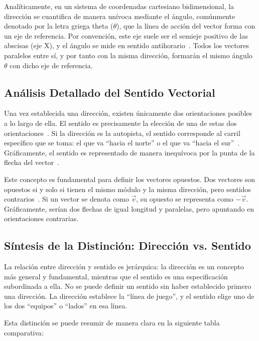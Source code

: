 \documentclass[12pt,a4paper]{article}
\begin{document}
Analíticamente, en un sistema de coordenadas cartesiano bidimensional, la dirección se cuantifica de manera unívoca mediante el ángulo, comúnmente denotado por la letra griega theta ($\theta$), que la línea de acción del vector forma con un eje de referencia. Por convención, este eje suele ser el semieje positivo de las abscisas (eje X), y el ángulo se mide en sentido antihorario~\cite{grossman2012}. Todos los vectores paralelos entre sí, y por tanto con la misma dirección, formarán el mismo ángulo $\theta$ con dicho eje de referencia.

\subsection{Análisis Detallado del Sentido Vectorial} \label{subsec:sentido}

Una vez establecida una dirección, existen únicamente dos orientaciones posibles a lo largo de ella. El sentido es precisamente la elección de una de estas dos orientaciones~\cite{superprof_vectores}. Si la dirección es la autopista, el sentido corresponde al carril específico que se toma: el que va ``hacia el norte'' o el que va ``hacia el sur''~\cite{superprof_vectores}. Gráficamente, el sentido es representado de manera inequívoca por la punta de la flecha del vector~\cite{kolman2006}.

Este concepto es fundamental para definir los vectores opuestos. Dos vectores son opuestos si y solo si tienen el mismo módulo y la misma dirección, pero sentidos contrarios~\cite{serway2008}. Si un vector se denota como $\vec{v}$, su opuesto se representa como $-\vec{v}$. Gráficamente, serían dos flechas de igual longitud y paralelas, pero apuntando en orientaciones contrarias.

\subsection{Síntesis de la Distinción: Dirección vs. Sentido} \label{subsec:sintesis}

La relación entre dirección y sentido es jerárquica: la dirección es un concepto más general y fundamental, mientras que el sentido es una especificación subordinada a ella. No se puede definir un sentido sin haber establecido primero una dirección. La dirección establece la ``línea de juego'', y el sentido elige uno de los dos ``equipos'' o ``lados'' en esa línea.

Esta distinción se puede resumir de manera clara en la siguiente tabla comparativa:
\end{document}
